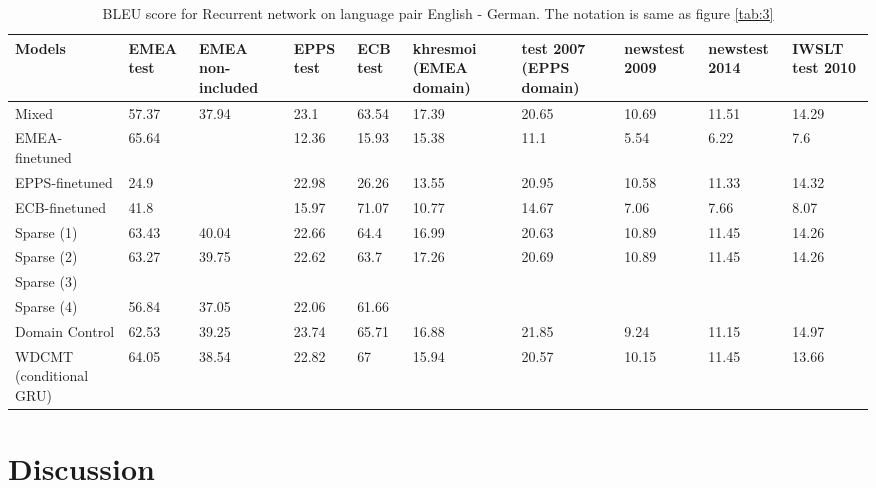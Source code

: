 \documentclass[11pt,a4paper]{article}
\begin{document}
\begin{table}
\begin{center}
 \begin{tabularx}{\textwidth}{|| X | X | X | X | X | X | X | X | X | X ||} 
 \hline
 Models & EMEA test & EMEA non-included & EPPS test & ECB test & khresmoi (EMEA domain) & test 2007 (EPPS domain) & newstest 2009 & newstest 2014 & IWSLT test 2010 \\ [0.5ex] 
 \hline\hline
 Mixed & 57.37 & 37.94 & 23.1 & 63.54 & 17.39 & 20.65 & 10.69 & 11.51 & 14.29 \\
 \hline
 EMEA-finetuned & 65.64 & & 12.36 & 15.93 & 15.38 & 11.1 & 5.54 & 6.22 & 7.6 \\
 \hline
 EPPS-finetuned & 24.9 & & 22.98 & 26.26 & 13.55 & 20.95 & 10.58 & 11.33 & 14.32 \\
 \hline
 ECB-finetuned & 41.8 & & 15.97 & 71.07 & 10.77 & 14.67 & 7.06 & 7.66 & 8.07 \\
 \hline
 Sparse (1) & 63.43 & 40.04 & 22.66 & 64.4 & 16.99 & 20.63 & 10.89 & 11.45 & 14.26 \\
 \hline
 Sparse (2) & 63.27 & 39.75 & 22.62 & 63.7 & 17.26 & 20.69 & 10.89 & 11.45 & 14.26 \\
 \hline
 Sparse (3) &  &  &  &  & &  &  &  & \\
 \hline
 Sparse (4) & 56.84 & 37.05 & 22.06 & 61.66 &  &  &  &  & \\
 \hline
 Domain Control & 62.53 & 39.25 & 23.74 & 65.71 & 16.88 & 21.85 & 9.24 & 11.15 & 14.97 \\
 \hline
 WDCMT (conditional GRU) & 64.05 & 38.54 & 22.82 & 67 & 15.94 & 20.57 & 10.15 & 11.45 & 13.66 \\
 \hline 
\end{tabularx}
\end{center}
\caption{BLEU score for Recurrent network on language pair English - German. The notation is same as figure \ref{tab:3}}
\label{tab:4}
\end{table}

\section{Discussion\label{sec:Discussion}}
\end{document}
